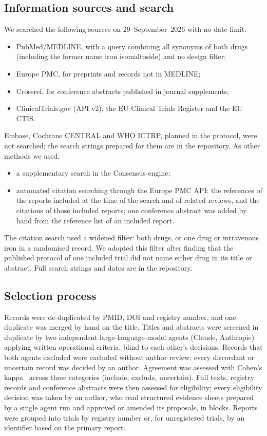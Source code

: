 \documentclass[11pt,a4paper]{article}
\begin{document}
\subsection{Information sources and search}
We searched the following sources on 29~September~2026 with no date limit:
\begin{itemize}
\item PubMed/MEDLINE, with a query combining all synonyms of both drugs (including the former name iron isomaltoside) and no design filter;
\item Europe PMC, for preprints and records not in MEDLINE;
\item Crossref, for conference abstracts published in journal supplements;
\item ClinicalTrials.gov (API v2), the EU Clinical Trials Register and the EU CTIS.
\end{itemize}
Embase, Cochrane CENTRAL and WHO ICTRP, planned in the protocol, were not searched; the search strings prepared for them are in the repository. As other methods we used:
\begin{itemize}
\item a supplementary search in the Consensus engine;
\item automated citation searching through the Europe PMC API: the references of the reports included at the time of the search and of related reviews, and the citations of those included reports; one conference abstract was added by hand from the reference list of an included report.
\end{itemize}
The citation search used a widened filter: both drugs, or one drug or intravenous iron in a randomised record. We adopted this filter after finding that the published protocol of one included trial did not name either drug in its title or abstract. Full search strings and dates are in the repository.

\subsection{Selection process}
Records were de-duplicated by PMID, DOI and registry number, and one duplicate was merged by hand on the title. Titles and abstracts were screened in duplicate by two independent large-language-model agents (Claude, Anthropic) applying written operational criteria, blind to each other's decisions. Records that both agents excluded were excluded without author review; every discordant or uncertain record was decided by an author. Agreement was assessed with Cohen's kappa~\cite{Cohen1960} across three categories (include, exclude, uncertain). Full texts, registry records and conference abstracts were then assessed for eligibility; every eligibility decision was taken by an author, who read structured evidence sheets prepared by a single agent run and approved or amended its proposals, in blocks. Reports were grouped into trials by registry number or, for unregistered trials, by an identifier based on the primary report.
\end{document}
